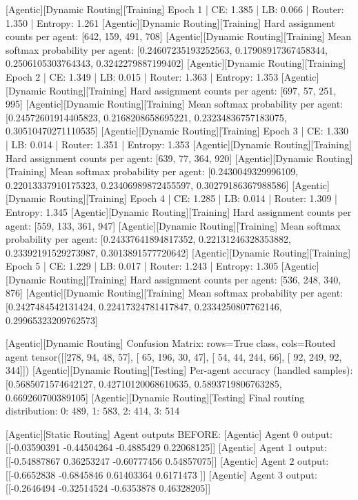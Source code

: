 [Agentic][Dynamic Routing][Training] Epoch 1 | CE: 1.385 | LB: 0.066 | Router: 1.350 | Entropy: 1.261
[Agentic][Dynamic Routing][Training] Hard assignment counts per agent: [642, 159, 491, 708]
[Agentic][Dynamic Routing][Training] Mean softmax probability per agent: [0.24607235193252563, 0.17908917367458344, 0.2506105303764343, 0.3242279887199402]
[Agentic][Dynamic Routing][Training] Epoch 2 | CE: 1.349 | LB: 0.015 | Router: 1.363 | Entropy: 1.353
[Agentic][Dynamic Routing][Training] Hard assignment counts per agent: [697, 57, 251, 995]
[Agentic][Dynamic Routing][Training] Mean softmax probability per agent: [0.24572601914405823, 0.2168208658695221, 0.23234836757183075, 0.30510470271110535]
[Agentic][Dynamic Routing][Training] Epoch 3 | CE: 1.330 | LB: 0.014 | Router: 1.351 | Entropy: 1.353
[Agentic][Dynamic Routing][Training] Hard assignment counts per agent: [639, 77, 364, 920]
[Agentic][Dynamic Routing][Training] Mean softmax probability per agent: [0.2430049329996109, 0.22013337910175323, 0.23406989872455597, 0.30279186367988586]
[Agentic][Dynamic Routing][Training] Epoch 4 | CE: 1.285 | LB: 0.014 | Router: 1.309 | Entropy: 1.345
[Agentic][Dynamic Routing][Training] Hard assignment counts per agent: [559, 133, 361, 947]
[Agentic][Dynamic Routing][Training] Mean softmax probability per agent: [0.24337641894817352, 0.22131246328353882, 0.23392191529273987, 0.3013891577720642]
[Agentic][Dynamic Routing][Training] Epoch 5 | CE: 1.229 | LB: 0.017 | Router: 1.243 | Entropy: 1.305
[Agentic][Dynamic Routing][Training] Hard assignment counts per agent: [536, 248, 340, 876]
[Agentic][Dynamic Routing][Training] Mean softmax probability per agent: [0.2427484542131424, 0.22417324781417847, 0.2334250807762146, 0.29965323209762573]

[Agentic][Dynamic Routing] Confusion Matrix: rows=True class, cols=Routed agent
tensor([[278,  94,  48,  57],
[ 65, 196,  30,  47],
[ 54,  44, 244,  66],
[ 92, 249,  92, 344]])
[Agentic][Dynamic Routing][Testing] Per-agent accuracy (handled samples): [0.5685071574642127, 0.42710120068610635, 0.5893719806763285, 0.669260700389105]
[Agentic][Dynamic Routing][Testing] Final routing distribution: {0: 489, 1: 583, 2: 414, 3: 514}

[Agentic][Static Routing] Agent outputs BEFORE:
[Agentic] Agent 0 output: [[-0.03590391 -0.44504264 -0.4885429   0.22068125]]
[Agentic] Agent 1 output: [[-0.54887867  0.36253247 -0.60777456  0.54857075]]
[Agentic] Agent 2 output: [[-0.6652838  -0.6845846   0.61403364  0.6171473 ]]
[Agentic] Agent 3 output: [[-0.2646494  -0.32514524 -0.6353878   0.46328205]]

